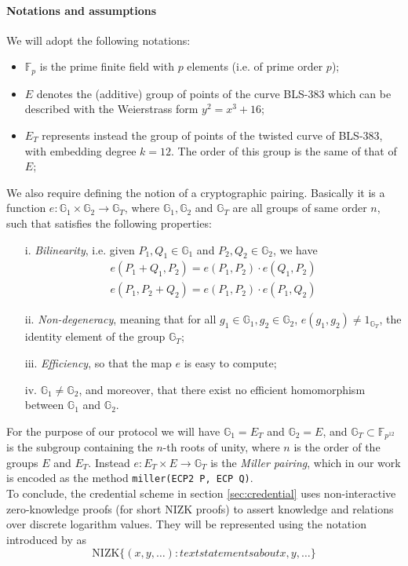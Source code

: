 \documentclass[twocolumn]{article}
\begin{document}
\paragraph*{Notations and assumptions}
We will adopt the following notations:
\begin{itemize}
    \item $\mathbb{F}_p$ is the prime finite field with $p$ elements (i.e. of prime order $p$); %
    \item $E$ denotes the (additive) group of points of the curve BLS-383 \citep{bls383} which can be described with the Weierstrass form  $y^2=x^3 + 16$; 
    \item $E_T$ represents instead the group of points of the twisted curve of BLS-383, with embedding degree $k=12$. The order of this group is the same of that of $E$;
\end{itemize}
We also require defining the notion of a cryptographic pairing. Basically it is a function $e: \mathbb{G}_1\times\mathbb{G}_2\to \mathbb{G}_T$, where $\mathbb{G}_1,\mathbb{G}_2$ and $\mathbb{G}_T$ are all groups of same order $n$, such that satisfies the following properties:
\begin{itemize}
    \item [i.] \emph{Bilinearity}, i.e. given $P_1,Q_1\in\mathbb{G}_1$ and $P_2,Q_2\in\mathbb{G}_2$, we have 
    \begin{align*}
        e(P_1+Q_1,P_2) = e(P_1,P_2)\cdot e(Q_1,P_2) \\
        e(P_1,P_2+Q_2) = e(P_1,P_2)\cdot e(P_1,Q_2)
    \end{align*}
    \item[ii.] \emph{Non-degeneracy}, meaning that for all $g_1\in\mathbb{G}_1, g_2\in\mathbb{G}_2$, $e(g_1,g_2)\ne 1_{\mathbb{G}_T}$, the identity element of the group $\mathbb{G}_T$;
    \item[iii.] \emph{ Efficiency}, so that the map $e$ is easy to compute;
    \item[iv. ] $\mathbb{G}_1\ne \mathbb{G}_2$, and moreover, that there exist no efficient homomorphism between $\mathbb{G}_1$ and $\mathbb{G}_2$.
\end{itemize}
For the purpose of our protocol we will have $\mathbb{G}_1 = E_T$ and $\mathbb{G}_2 = E$, and $\mathbb{G}_T\subset \mathbb{F}_{p^{12}}$ is the subgroup containing the $n$-th roots of unity, where $n$ is the order of the groups $E$ and $E_T$. Instead $e: E_T  \times E\to \mathbb{G}_T$ is the \emph{Miller pairing}, which in our work is encoded as the method \verb!miller(ECP2 P, ECP Q)!. \\
To conclude, the credential scheme in section \ref{sec:credential} uses non-interactive zero-knowledge proofs (for short NIZK proofs) to assert knowledge and relations over discrete logarithm values. They will be represented using the notation introduced by \cite{camenisch} as 
\[
\text{NIZK}\{(x,y,\dots): text{statements about x, y,}\dots \}
\]
\pagebreak
\end{document}
